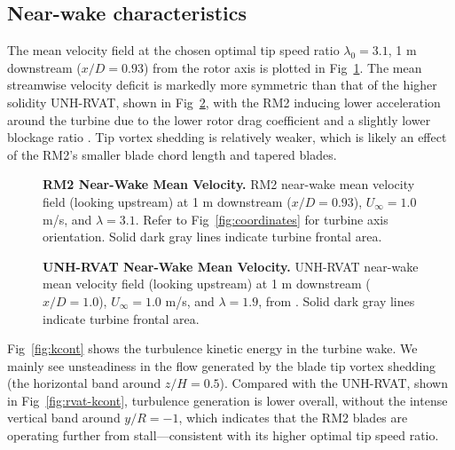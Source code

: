 \documentclass[10pt,letterpaper]{article}
\begin{document}
\subsection*{Near-wake characteristics}

The mean velocity field at the chosen optimal tip speed ratio $\lambda_0=3.1$, 1
m downstream ($x/D=0.93$) from the rotor axis is plotted in
Fig~\ref{fig:meancontquiv}. The mean streamwise velocity deficit is markedly
more symmetric than that of the higher solidity UNH-RVAT, shown in
Fig~\ref{fig:rvat-meancontquiv}, with the RM2 inducing lower acceleration
around the turbine due to the lower rotor drag coefficient and a slightly lower
blockage ratio \cite{Bachant2015-JoT}. Tip vortex shedding is relatively weaker,
which is likely an effect of the RM2's smaller blade chord length and tapered
blades.

\begin{figure}

    \caption{{\bf RM2 Near-Wake Mean Velocity.} RM2 near-wake mean velocity
        field (looking upstream) at 1 m downstream ($x/D=0.93$), $U_\infty=1.0$ m/s,
        and $\lambda=3.1$. Refer to Fig~\ref{fig:coordinates} for turbine axis
        orientation. Solid dark gray lines indicate turbine frontal area.}

    \label{fig:meancontquiv}
\end{figure}

\begin{figure}

    \caption{{\bf UNH-RVAT Near-Wake Mean Velocity.} UNH-RVAT near-wake mean
        velocity field (looking upstream) at 1 m downstream ($x/D=1.0$),
        $U_\infty=1.0$ m/s, and $\lambda=1.9$, from \cite{Bachant2016-Energies}.
        Solid dark gray lines indicate turbine frontal area.}

    \label{fig:rvat-meancontquiv}
\end{figure}

Fig~\ref{fig:kcont} shows the turbulence kinetic energy in the turbine wake. We
mainly see unsteadiness in the flow generated by the blade tip vortex shedding
(the horizontal band around $z/H=0.5$). Compared with the UNH-RVAT, shown in
Fig~\ref{fig:rvat-kcont}, turbulence generation is lower overall, without the
intense vertical band around $y/R=-1$, which indicates that the RM2 blades are
operating further from stall---consistent with its higher optimal tip speed
ratio.
\end{document}
